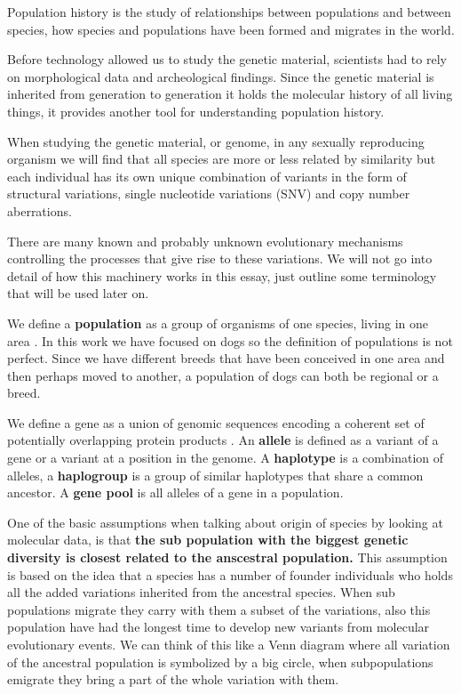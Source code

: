 \documentclass[a4paper,11pt]{kth-mag}
\begin{document}
Population history is the study of relationships between populations and between species, how species and populations have been formed and migrates in the world.

Before technology allowed us to study the genetic material, scientists had to rely on morphological data and archeological findings. Since the genetic material is inherited from generation to generation it holds the molecular history of all living things, it provides another tool for understanding population history.
 
When studying the genetic material, or genome, in any sexually reproducing organism we will find that all species are more or less related by similarity but each individual has its own unique combination of variants in the form of structural variations, single nucleotide variations (SNV) and copy number aberrations.
 
There are many known and probably unknown evolutionary mechanisms controlling the processes that give rise to these variations. We will not go into detail of how this machinery works in this essay, just outline some terminology that will be used later on.

We define a \textbf{population} as a group of organisms of one species, living in one area \cite{fundamental}. In this work we have focused on dogs so the definition of populations is not perfect. Since we have different breeds that have been conceived in one area and then perhaps moved to another, a population of dogs can both be regional or a breed.
 
We define a gene as a union of genomic sequences encoding a coherent set of potentially overlapping protein products \cite{gerstein07}. An \textbf{allele} is defined as a variant of a gene or a variant at a position in the genome. A \textbf{haplotype} is a combination of alleles, a \textbf{haplogroup} is a group of similar haplotypes that share a common ancestor. A \textbf{gene pool} is all alleles of a gene in a population.

One of the basic assumptions when talking about origin of species by looking at molecular data, is that \textbf{the sub population with the biggest genetic diversity is closest related to the anscestral population.} This assumption is based on the idea that a species has a number of founder individuals who holds all the added variations inherited from the ancestral species. When sub populations migrate they carry with them a subset of the variations, also this population have had the longest time to develop new variants from molecular evolutionary events. We can think of this like a Venn diagram where all variation of the ancestral population is symbolized by a big circle, when subpopulations emigrate they bring a part of the whole variation with them.
\end{document}
